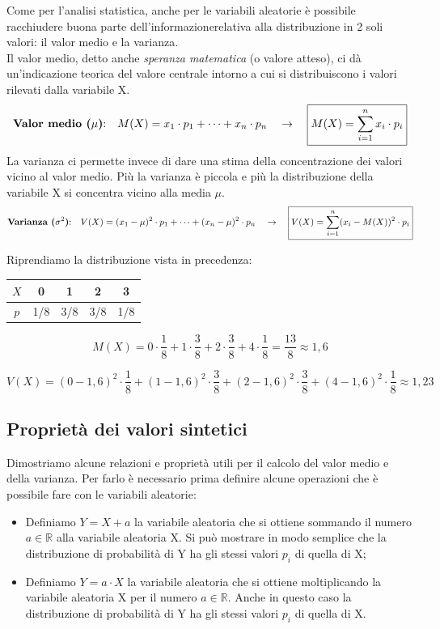 Come per l'analisi statistica, anche per le variabili aleatorie è possibile racchiudere buona parte dell'informazionerelativa alla distribuzione in 2 soli valori: il valor medio e la varianza.\\
Il valor medio, detto anche \emph{speranza matematica} (o valore atteso), ci dà un'indicazione teorica del valore centrale intorno a cui si distribuiscono i valori rilevati dalla variabile X. 
\[\text{\textbf{Valor medio ($\mu$)}:} \quad M(X) = x_1 \cdot p_1+\dots + x_n \cdot p_n  \quad \rightarrow \quad \boxed{M(X) = \sum_{i = 1}^n x_i \cdot p_i}\]
La varianza ci permette invece di dare una stima della concentrazione dei valori vicino al valor medio. Più la varianza è piccola e più la distribuzione della variabile X si concentra vicino alla media $\mu$.
\[\text{\textbf{Varianza ($\sigma^2$)}:} \quad V(X) = (x_1-\mu)^2 \cdot p_1+\dots + (x_n-\mu)^2 \cdot p_n  \quad \rightarrow \quad \boxed{V(X) = \sum_{i = 1}^n (x_i-M(X))^2 \cdot p_i}\]
\begin{esempio} Riprendiamo la distribuzione vista in precedenza:\\[4pt]

\begin{minipage}[r]{.4\textwidth}
\renewcommand\arraystretch{1.4}
\setlength\arraycolsep{25pt}
 \quad \begin{tabular}{c|c|c|c|c}
$X$ & 0 & 1 & 2 & 3\\
\hline
$p$ & 1/8 & 3/8 & 3/8 & 1/8
\end{tabular}
\end{minipage}\hfil
\begin{minipage}[c]{.55\textwidth}
\[ M(X) = 0\cdot \dfrac{1}{8}+1\cdot \dfrac{3}{8}+2\cdot \dfrac{3}{8}+4\cdot \dfrac{1}{8} = \dfrac{13}{8} \approx 1,6\]
\end{minipage}
\[ V(X) = (0-1,6)^2\cdot \dfrac{1}{8}+(1-1,6)^2\cdot \dfrac{3}{8}+(2-1,6)^2\cdot \dfrac{3}{8}+(4-1,6)^2\cdot \dfrac{1}{8} \approx 1,23\]
\end{esempio}

\subsection{Proprietà dei valori sintetici}

 Dimostriamo alcune relazioni e proprietà utili per il calcolo del valor medio e della varianza. Per farlo è necessario prima definire alcune operazioni che è possibile fare con le variabili aleatorie:
 \begin{itemize}
 \item Definiamo $Y = X+a$ la variabile aleatoria che si ottiene sommando il numero $a\in \mathbb{R}$ alla variabile aleatoria X. Si può mostrare in modo semplice che la distribuzione di probabilità di Y ha gli stessi valori $p_i$ di quella di X;
 \item Definiamo $Y = a\cdot X$ la variabile aleatoria che si ottiene moltiplicando la variabile aleatoria X per il numero $a\in \mathbb{R}$. Anche in questo caso la distribuzione di probabilità di Y ha gli stessi valori $p_i$ di quella di X.
 \end{itemize}
 
